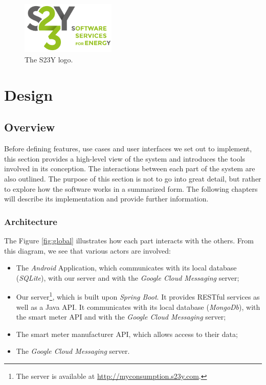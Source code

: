 \documentclass[a4paper, oneside, 11pt]{book}
\newcommand\partcontent{}
\begin{document}
\begin{figure}[htbp]
	\centerline{\includegraphics[width=0.4\textwidth]{logo_s23y.png}}
	\caption{The S23Y logo.}
	\label{fig:logo_s23y}
\end{figure}

\part{Design}
\renewcommand\partcontent{DESIGN: }

\chapter{Overview}
Before defining features, use cases and user interfaces we set out to implement, this section provides a high-level view of the system and introduces the tools involved in its conception. The interactions between each part of the system are also outlined. The purpose of this section is not to go into great detail, but rather to explore how the software works in a summarized form. The following chapters will describe its implementation and provide further information.

\section{Architecture}
The Figure \ref{fig:global} illustrates how each part interacts with the others. From this diagram, we see that various actors are involved:
\begin{itemize}
	\item The \textit{Android} Application, which communicates with its local database (\textit{SQLite}), with our server and with the \textit{Google Cloud Messaging} server;
	\item Our server\footnote{The server is available at \url{http://myconsumption.s23y.com}.}, which is built upon \textit{Spring Boot}. It provides RESTful services as well as a Java API. It communicates with its local database (\textit{MongoDb}), with the smart meter API and with the \textit{Google Cloud Messaging} server;
	\item The smart meter manufacturer API, which allows access to their data;
	\item The \textit{Google Cloud Messaging} server.
\end{itemize}
\end{document}
